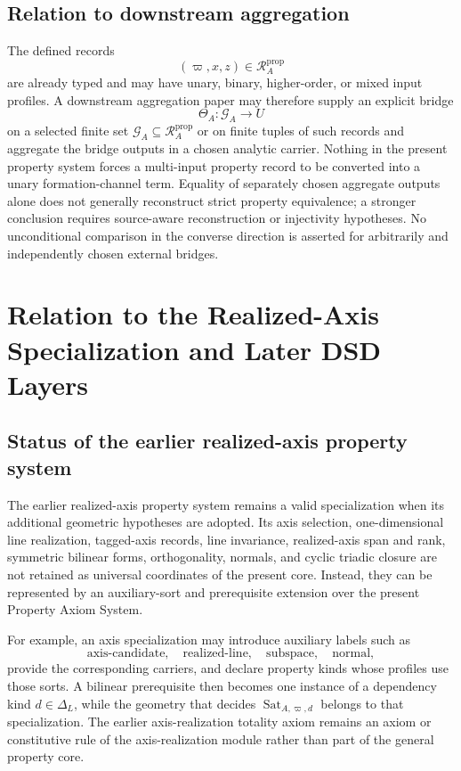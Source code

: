 \documentclass[11pt]{article}
\newcommand{\Dep}{\Delta_{L}}
\newcommand{\Sat}{\operatorname{Sat}}
\newcommand{\PropRec}{\mathcal R^{\mathrm{prop}}}
\theoremstyle{definition}
\theoremstyle{remark}
\begin{document}
\subsection{Relation to downstream aggregation}

The defined records
\[
(\varpi,x,z)\in\PropRec_A
\]
are already typed and may have unary, binary, higher-order, or mixed input profiles.
A downstream aggregation paper may therefore supply an explicit bridge
\[
\Theta_A:\mathcal G_A\longrightarrow U
\]
on a selected finite set \(\mathcal G_A\subseteq\PropRec_A\) or on finite tuples of such records and aggregate the bridge outputs in a chosen analytic carrier.
Nothing in the present property system forces a multi-input property record to be converted into a unary formation-channel term.
Equality of separately chosen aggregate outputs alone does not generally reconstruct strict property equivalence; a stronger conclusion requires source-aware reconstruction or injectivity hypotheses.
No unconditional comparison in the converse direction is asserted for arbitrarily and independently chosen external bridges.

\section{Relation to the Realized-Axis Specialization and Later DSD Layers}
\label{sec:specialization}

\subsection{Status of the earlier realized-axis property system}

The earlier realized-axis property system \cite{KwonAxisProperty} remains a valid specialization when its additional geometric hypotheses are adopted.
Its axis selection, one-dimensional line realization, tagged-axis records, line invariance, realized-axis span and rank, symmetric bilinear forms, orthogonality, normals, and cyclic triadic closure are not retained as universal coordinates of the present core.
Instead, they can be represented by an auxiliary-sort and prerequisite extension over the present Property Axiom System.

For example, an axis specialization may introduce auxiliary labels such as
\[
\mathrm{axis\mbox{-}candidate},\quad
\mathrm{realized\mbox{-}line},\quad
\mathrm{subspace},\quad
\mathrm{normal},
\]
provide the corresponding carriers, and declare property kinds whose profiles use those sorts.
A bilinear prerequisite then becomes one instance of a dependency kind \(d\in\Dep\), while the geometry that decides \(\Sat_{A,\varpi,d}\) belongs to that specialization.
The earlier axis-realization totality axiom remains an axiom or constitutive rule of the axis-realization module rather than part of the general property core.
\end{document}
